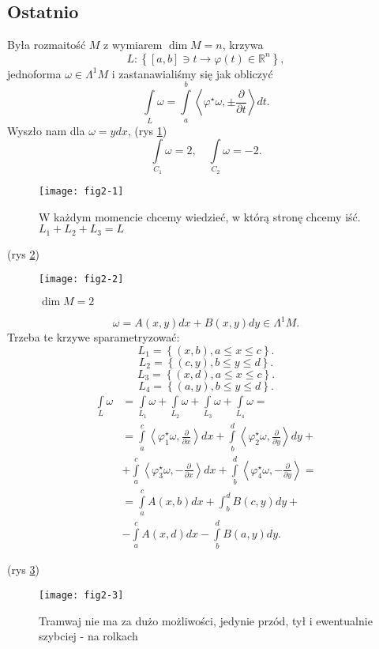 \documentclass[../main.tex]{subfiles}
\begin{document}
    \subsection{Ostatnio}
    Była rozmaitość $M$ z wymiarem $\dim M = n$, krzywa
    \[
        L : \left\{ [a,b]\ni t \to \varphi(t)\in \mathbb{R}^n \right\}
    ,\]
jednoforma $\omega \in \Lambda^1M$ i zastanawialiśmy się jak obliczyć
\[
\int\limits_L\omega = \int\limits_a^b\left<\varphi^\star \omega, \pm\frac{\partial }{\partial t}  \right>dt
.\]
Wyszło nam dla $\omega = ydx$, (rys \ref{fig:fig2-1})
 \[
\int\limits_{C_1}\omega = 2,\quad \int\limits_{C_2}\omega = -2
.\]
\begin{figure}[h]
    \centering
    \texttt{[image: fig2-1]}
    \caption{W każdym momencie chcemy wiedzieć, w którą stronę chcemy iść. $L_1 + L_2 + L_3 = L$}
    \label{fig:fig2-1}
\end{figure}
\begin{przyklad}
    (rys \ref{fig:fig2-2})
    \begin{figure}[h]
        \centering
        \texttt{[image: fig2-2]}
        \caption{$\dim M = 2$}
        \label{fig:fig2-2}
    \end{figure}
    \[
        \omega = A(x,y)dx + B(x,y)dy\in \Lambda^1M
    .\]
Trzeba te krzywe sparametryzować:
\[
    L_1 = \left\{ (x,b), a \le x \le c \right\}
.\]
\[
    L_2 = \left\{ (c,y), b \le y \le d \right\}
.\]
\[
    L_3 = \left\{ (x,d), a \le x \le c \right\}
.\]
\[
    L_4 = \left\{ (a,y), b \le y \le d \right\}
.\]
\begin{align*}
    \int\limits_L\omega &= \int\limits_{L_1}\omega + \int\limits_{L_2}\omega + \int\limits_{L_3}\omega + \int\limits_{L_4}\omega =\\
    &= \int\limits_a^c\left<\varphi_1^\star\omega, \frac{\partial }{\partial x}  \right>dx + \int\limits_b^d\left<\varphi_2^\star \omega, \frac{\partial }{\partial y}  \right>dy + \\
    &+ \int\limits_a^c\left<\varphi^\star_3\omega, -\frac{\partial }{\partial x}  \right>dx + \int\limits_b^d\left<\varphi_4^\star \omega, -\frac{\partial }{\partial y}  \right> =\\
    &= \int\limits_a^c A(x,b)dx + \int_b^d B(c,y)dy +\\
    &- \int\limits_a^cA(x,d)dx - \int\limits_b^dB(a,y)dy
.\end{align*}
\end{przyklad}
(rys \ref{fig:fig2-3})\\
\begin{figure}[h]
    \centering
    \texttt{[image: fig2-3]}
    \caption{Tramwaj nie ma za dużo możliwości, jedynie przód, tył i ewentualnie szybciej - na rolkach}
    \label{fig:fig2-3}
\end{figure}
\end{document}
